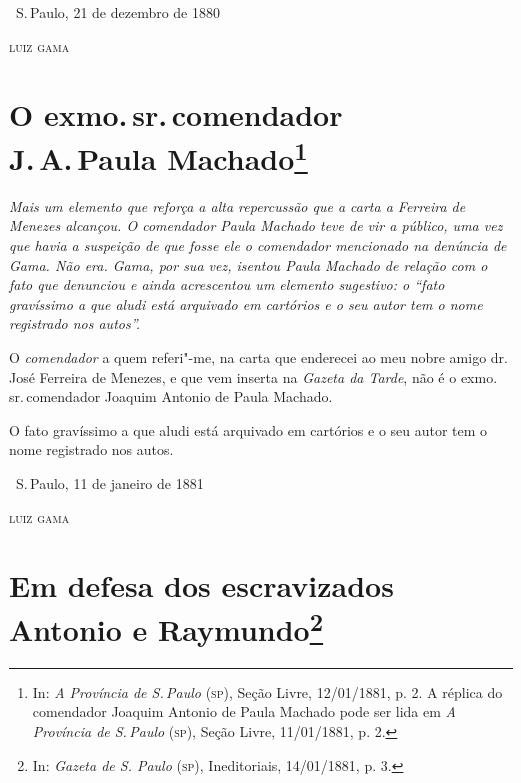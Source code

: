 \noindent\dotfill\bigskip

\hfill\ S.\,Paulo, 21 de dezembro de 1880\smallskip

\hfill\textsc{luiz gama}


\chapter[O exmo.\,sr.\,comendador J.\,A.\,Paula Machado]{O exmo.\,sr.\,comendador\\ J.\,A.\,Paula Machado\footnote[*]{In:
  \emph{A Província de S.\,Paulo} (\textsc{sp}), Seção Livre, 12/01/1881, p. 2. A
  réplica do comendador Joaquim Antonio de Paula Machado pode ser lida
  em \emph{A Província de S.\,Paulo} (\textsc{sp}), Seção Livre, 11/01/1881, p. 2.}}

\begin{flushleft}
{\footnotesize\itshape
Mais um elemento que reforça a alta repercussão que a carta a
Ferreira de Menezes alcançou. O comendador Paula Machado teve de vir a
público, uma vez que havia a suspeição de que fosse ele o comendador
mencionado na denúncia de Gama. Não era. Gama, por sua vez, isentou
Paula Machado de relação com o fato que denunciou e ainda acrescentou um
elemento sugestivo: o ``fato gravíssimo a que aludi está arquivado em
cartórios e o seu autor tem o nome registrado nos autos''. }
\end{flushleft}

\noindent{}O \emph{comendador} a quem referi"-me, na carta que enderecei ao meu
nobre amigo dr.\,José Ferreira de Menezes, e que vem inserta na
\emph{Gazeta da Tarde}, não é o exmo.\,sr.\,comendador Joaquim Antonio de
Paula Machado.

O fato gravíssimo a que aludi está arquivado em cartórios e o seu autor
tem o nome registrado nos autos.

\bigskip

\hfill\ S.\,Paulo, 11 de janeiro de 1881

\hfill\textsc{luiz gama}


\chapter[Em defesa dos escravizados Antonio e Raymundo]{Em defesa dos escravizados\\ Antonio e Raymundo\footnote[*]{In: \emph{Gazeta de S.
  Paulo} (\textsc{sp}), Ineditoriais, 14/01/1881, p. 3.}}

